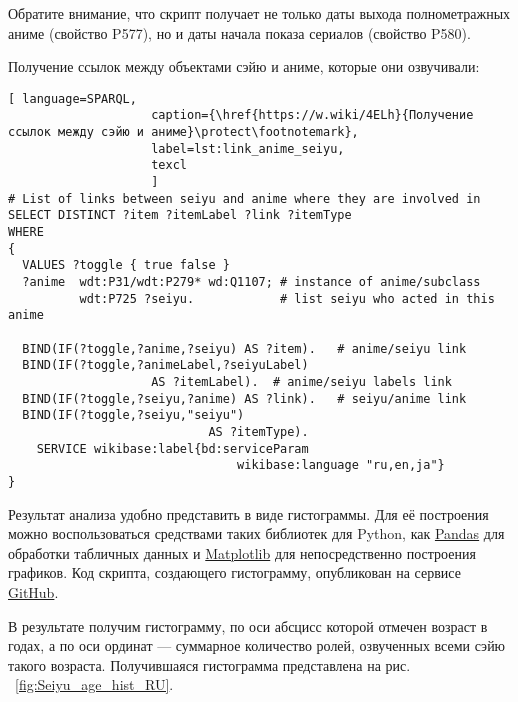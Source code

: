 Обратите внимание, что скрипт получает не только даты выхода полнометражных аниме (свойство P577), но и даты начала показа сериалов (свойство P580). 

Получение ссылок между объектами сэйю и аниме, которые они озвучивали: 

\begin{lstlisting}[ language=SPARQL, 
                    caption={\href{https://w.wiki/4ELh}{Получение ссылок между сэйю и аниме}\protect\footnotemark},
                    label=lst:link_anime_seiyu,
                    texcl 
                    ]
# List of links between seiyu and anime where they are involved in
SELECT DISTINCT ?item ?itemLabel ?link ?itemType
WHERE
{
  VALUES ?toggle { true false }
  ?anime  wdt:P31/wdt:P279* wd:Q1107; # instance of anime/subclass
          wdt:P725 ?seiyu.            # list seiyu who acted in this anime
  
  BIND(IF(?toggle,?anime,?seiyu) AS ?item).   # anime/seiyu link
  BIND(IF(?toggle,?animeLabel,?seiyuLabel)
					AS ?itemLabel).  # anime/seiyu labels link
  BIND(IF(?toggle,?seiyu,?anime) AS ?link).   # seiyu/anime link
  BIND(IF(?toggle,?seiyu,"seiyu")
							AS ?itemType).
    SERVICE wikibase:label{bd:serviceParam
					     		wikibase:language "ru,en,ja"}
}
\end{lstlisting}%

Результат анализа удобно представить в виде гистограммы. Для её построения можно воспользоваться средствами таких библиотек для Python, как \href{https://ru.wikipedia.org/wiki/Pandas}{Pandas} для обработки табличных данных и \href{https://ru.wikipedia.org/wiki/Matplotlib}{Matplotlib} для непосредственно построения графиков. Код скрипта, создающего гистограмму, опубликован на сервисе \href{https://github.com/componavt/wd_book/blob/master/programming_tasks/seiyu_age/age_act_hist.ipynb}{GitHub}.

В результате получим гистограмму, по оси абсцисс которой отмечен возраст в годах, а по оси ординат — суммарное количество ролей, озвученных всеми сэйю такого возраста. Получившаяся гистограмма представлена на рис. ~\ref{fig:Seiyu_age_hist_RU}. 

\begin{figure*}[h]

    \setlength{\fboxsep}{0pt}%
    \setlength{\fboxrule}{1pt}%
	\caption[Гистограмма, которая отображает число аниме, озвученное сэйю разных возрастов, 2021.]{Гистограмма, которая показывает число аниме, озвученных различными сэйю, 2021. Гистограмма построена на основе данных, полученных с помощью запроса ~\protect\ref{lst:link_anime_seiyu}.}%
    \label{fig:Seiyu_age_hist_RU}%
\end{figure*} 

